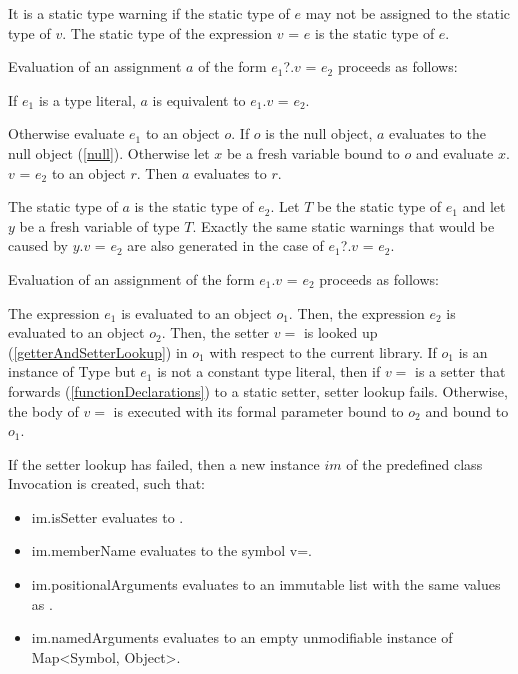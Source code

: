 \documentclass{article}
\newcommand{\code}[1]{{\sf #1}}
\begin{document}
\LMHash{}
It is a static type warning if the static type of $e$ may not be assigned to the static type of $v$. The static type of the expression $v$ \code{=} $e$ is the static type of $e$.

\LMHash{}
Evaluation of an assignment $a$ of the form \code{$e_1$?.$v$ = $e_2$}
proceeds as follows:

\LMHash
If $e_1$ is a type literal, $a$ is equivalent to \code{$e_1$.$v$ = $e_2$}.

\LMHash{}
Otherwise evaluate $e_1$ to an object $o$.
If $o$ is the null object, $a$ evaluates to the null object (\ref{null}).
Otherwise let $x$ be a fresh variable bound to $o$
and evaluate \code{$x$.$v$ = $e_2$} to an object $r$.
Then $a$ evaluates to $r$.

\LMHash{}
The static type of $a$ is the static type of $e_2$. Let $T$ be the static type of $e_1$ and let $y$ be a fresh variable of type $T$. Exactly the same static warnings that would be caused by \code{$y$.$v$ = $e_2$} are also generated in the case of \code{$e_1$?.$v$ = $e_2$}.

\LMHash{}
Evaluation of an assignment of the form \code{$e_1$.$v$ = $e_2$} proceeds as follows:

\LMHash{}
The expression $e_1$ is evaluated to an object $o_1$. Then, the expression $e_2$  is evaluated to an object $o_2$. Then, the setter $v=$ is looked up (\ref{getterAndSetterLookup}) in $o_1$ with respect to the current library.  If $o_1$ is an instance of \code{Type} but $e_1$ is not a constant type literal, then if $v=$ is a setter that forwards (\ref{functionDeclarations}) to a static setter, setter lookup fails. Otherwise, the body  of $v=$ is executed with its formal parameter bound to $o_2$ and \THIS{} bound to $o_1$.

\LMHash{}
If the setter lookup has failed, then a new instance $im$ of the predefined class \code{Invocation} is created, such that:
\begin{itemize}
\item \code{im.isSetter} evaluates to \code{\TRUE{}}.
\item \code{im.memberName} evaluates to the symbol \code{v=}.
\item \code{im.positionalArguments} evaluates to an immutable list with the same values as \code{[$o_2$]}.
\item \code{im.namedArguments} evaluates to an empty unmodifiable instance of \code{Map<Symbol, Object>}.
\end{itemize}
\end{document}
